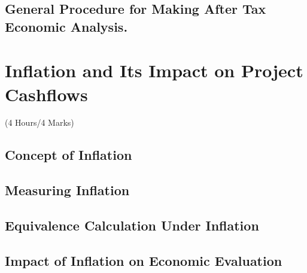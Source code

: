 \documentclass[12pt]{article}
\begin{document}
	\subsection{General Procedure for Making After Tax Economic Analysis.}

	\pagebreak
\section{Inflation and Its Impact on Project Cashflows}
	\begin{center}(4 Hours/4 Marks)\end{center}
	\subsection{Concept of Inflation}
	\subsection{Measuring Inflation}
	\subsection{Equivalence Calculation Under Inflation}
	\subsection{Impact of Inflation on Economic Evaluation}
\end{document}
